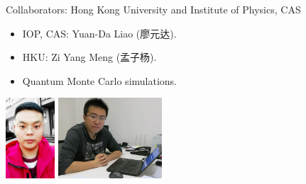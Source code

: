 \documentclass[xcolor=table, aspectratio=1610,ignorenonframetext]{beamer}
\begin{document}
\begin{frame}{Collaborators: Hong Kong University and Institute of Physics, CAS}
\begin{itemize}
	\item IOP, CAS: Yuan-Da Liao (廖元达).
	\item HKU: Zi Yang Meng (孟子杨).
	\item Quantum Monte Carlo simulations.
\end{itemize}
	\begin{center}
		\includegraphics[height=3cm]{../people/yuandaliao}
		\includegraphics[height=3cm]{../people/ziyangmeng}
	\end{center}
\end{frame}
\end{document}
